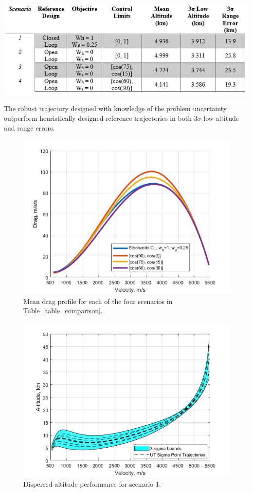 \documentclass[letterpaper, paper,11pt]{AAS}
\begin{document}
\begin{table}[h!]
	\centering
	\includegraphics[width=1\textwidth]{ddp/comparison_table}
	\caption{The robust trajectory designed with knowledge of the problem uncertainty outperform heuristically designed reference trajectories in both $3\sigma$ low altitude and range errors.}
	\label{table_comparison}
\end{table}
\begin{figure}[h!]
	\centering
	\includegraphics[width=1\textwidth]{ddp/matlab/ComparisonDrag}
	\caption{Mean drag profile for each of the four scenarios in Table~\ref{table_comparison}.}
	\label{fig_drag}
\end{figure}
\begin{figure}[h!]
	\centering
	\includegraphics[width=1\textwidth]{ddp/matlab/RobustTrajAlt}
	\caption{Dispersed altitude performance for scenario 1.}
	\label{fig_robust_alt}
\end{figure}
\end{document}
